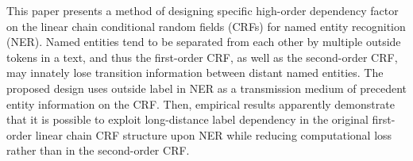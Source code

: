 This paper presents a method of designing specific high-order dependency factor on the linear chain conditional random fields (CRFs) for named entity recognition (NER). Named entities tend to be separated from each other by multiple outside tokens in a text, and thus the first-order CRF, as well as the second-order CRF, may innately lose transition information between distant named entities. The proposed design uses outside label in NER as a transmission medium of precedent entity information on the CRF. Then, empirical results apparently demonstrate that it is possible to exploit long-distance label dependency in the original first-order linear chain CRF structure upon NER while reducing computational loss rather than in the second-order CRF.

